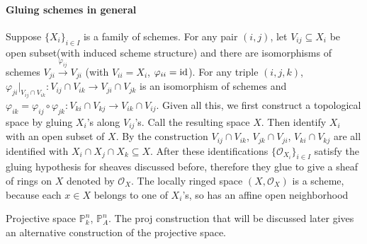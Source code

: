 \documentclass[main]{subfiles}
\begin{document}
\paragraph{Gluing schemes in general} Suppose $\{X_i\}_{i\in I}$ is a family of schemes. For any pair $(i,j)$, let $V_{ij}\subseteq X_i$ be open subset(with induced scheme structure) and there are isomorphisms of schemes $V_{ji}\xrightarrow{\varphi_{ij}}V_{ji}$ (with $V_{ii}=X_i$, $\varphi_{ii}=\operatorname{id}$). For any triple $(i,j,k)$, $\varphi_{ji}|_{V_{ij}\cap V_{ik}}:V_{ij}\cap V_{ik}\to V_{ji}\cap V_{jk}$ is an isomorphism of schemes and $\varphi_{ik}=\varphi_{ij}\circ\varphi_{jk}:V_{ki}\cap V_{kj}\to V_{ik}\cap V_{ij}$. Given all this, we first construct a topological space by gluing $X_i$'s along $V_{ij}$'s. Call the resulting space $X$. Then identify $X_i$ with an open subset of $X$. By the construction $V_{ij}\cap V_{ik}$, $V_{jk}\cap V_{ji}$, $V_{ki}\cap V_{kj}$ are all identified with $X_i\cap X_j\cap X_k\subseteq X$. After these identifications $\{\mathcal O_{X_i}\}_{i\in I}$ satisfy the gluing hypothesis for sheaves discussed before, therefore they glue to give a sheaf of rings on $X$ denoted by $\mathcal O_X$. The locally ringed space $(X,\mathcal O_X)$ is a scheme, because each $x\in X$ belongs to one of $X_i$'s, so has an affine open neighborhood

\begin{example}
Projective space $\mathbb P_k^n$, $\mathbb P_A^n$. The proj construction that will be discussed later gives an alternative construction of the projective space.
\end{example}
\end{document}
